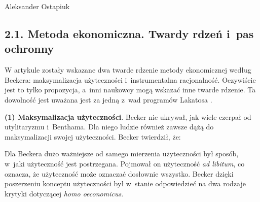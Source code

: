 \begin{artplenv}{Aleksander Ostapiuk}
\subsection{2.1. Metoda ekonomiczna. Twardy rdzeń i~pas ochronny}
W artykule zostały wskazane dwa twarde rdzenie metody ekonomicznej według Beckera: maksymalizacja
użyteczności i~instrumentalna racjonalność. Oczywiście jest to tylko propozycja, a~inni naukowcy mogą wskazać
inne twarde rdzenie. Ta
dowolność jest uważana jest za jedną z~wad programów Lakatosa
\parencite{marchi_appraising_1991}.

\textbf{(1) Maksymalizacja użyteczności}. Becker nie ukrywał, jak wiele czerpał od utylitaryzmu i~Benthama. Dla
niego ludzie również zawsze dążą do maksymalizacji swojej użyteczności. Becker twierdził, że:


Dla Beckera dużo ważniejsze od samego mierzenia użyteczności był sposób, w~jaki użyteczność jest postrzegana. Pojmował
on użyteczność \textit{ad libitum}, co oznacza, że użyteczność może oznaczać dosłownie wszystko. Becker dzięki
poszerzeniu konceptu użyteczności był w~stanie odpowiedzieć na dwa rodzaje krytyki dotyczącej \textit{homo oeconomicus}.


\end{artplenv}
